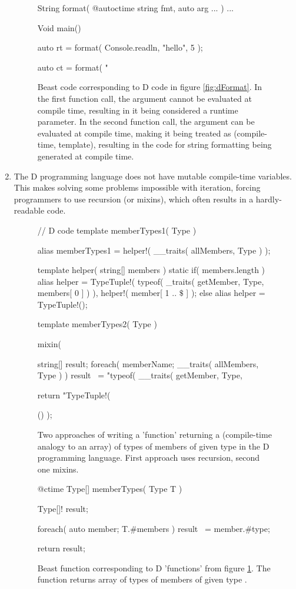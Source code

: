 \documentclass{ExcelAtFIT}
\begin{document}
\begin{enumerate}
 	\begin{figure}[h]
 	 	\begin{code}
String format( @autoctime string fmt, auto arg ... ) { ... }

Void main() {
	auto rt = format( Console.readln, "hello", 5 );
	
	auto ct = format( "%
}
	 	\end{code}
	 	\caption{Beast code corresponding to D code in figure \ref{fig:dFormat}. In the first  function call, the  argument cannot be evaluated at compile time, resulting in it being considered a runtime parameter. In the second function call, the argument can be evaluated at compile time, making it being treated as \ctime (compile-time, template), resulting in the code for string formatting being generated at compile time.}
	\end{figure}

	\item The D programming language does not have mutable compile-time variables. This makes solving some problems impossible with iteration, forcing programmers to use recursion (or mixins), which often results in a hardly-readable code.
	\begin{figure}[h]
		\begin{dcode}
// D code
template memberTypes1( Type ) {
	alias memberTypes1 = helper!( __traits( allMembers, Type ) );
	
	template helper( string[] members ) {
		static if( members.length )
			alias helper = TypeTuple!(
				typeof( _traits( getMember, Type, members[ 0 ] ) ),
				helper!( member[ 1 .. $\$$ ] 
				);
		else
			alias helper = TypeTuple!();
	}
}

template memberTypes2( Type ) {
	mixin( {
		string[] result;
		foreach( memberName; __traits( allMembers, Type ) )
			result ~= "typeof( __traits( getMember, Type, %
		
		return "TypeTuple!( %
	}() );
}
		\end{dcode}
		\caption{Two approaches of writing a 'function' returning a  (compile-time analogy to an array) of types of members of given type  in the D programming language. First approach uses recursion, second one mixins.}
		\label{fig:dMemberTypes}
	\end{figure}

	\begin{figure}[h]
		\begin{code}
@ctime Type[] memberTypes( Type T ) {
	Type[]! result;
	
	foreach( auto member; T.#members )
		result ~= member.#type;
	
	return result;
}
		\end{code}
		\caption{Beast function corresponding to D 'functions' from figure \ref{fig:dMemberTypes}. The function returns array of types of members of given type .}
	\end{figure}
	
 
\end{enumerate}
\end{document}
